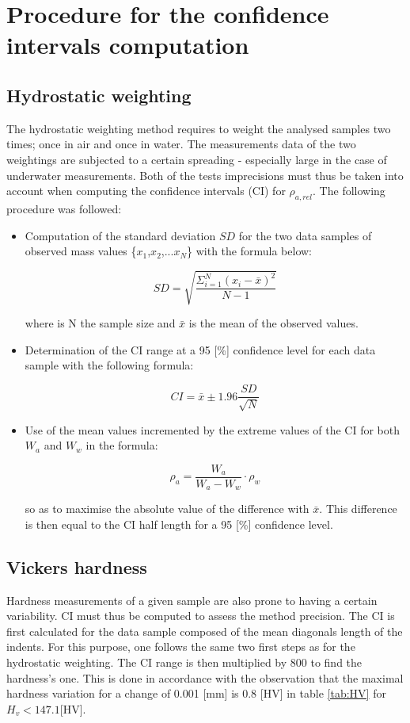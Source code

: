 
\chapter{Procedure for the confidence intervals computation} %

\label{AppendixC} %

\section{Hydrostatic weighting}

The hydrostatic weighting method requires to weight the analysed samples two times; once in air and once in water. The measurements data of the two weightings are subjected to a certain spreading - especially large in the case of underwater measurements. Both of the tests imprecisions must thus be taken into account when computing the confidence intervals (CI) for $\rho_{a,rel}$. The following procedure was followed:

\begin{itemize}
\item Computation of the standard deviation $SD$ for the two data samples of observed mass values \{$x_1$,$x_2$,...$x_N$\} with the formula below:

$$SD=\sqrt{\frac{\Sigma^N_{i=1}(x_i-\bar{x})^2}{N-1}} $$

where is N the sample size and $\bar{x}$ is the mean of the observed values.

\item Determination of the CI range at a 95 [\%] confidence level for each data sample with the following formula:

$$CI= \bar{x} \pm 1.96 \frac{SD}{\sqrt{N}}$$

\item Use of the mean values incremented by the extreme values of the CI for both $W_a$ and $W_w$ in the formula:


$$\rho_a=\frac{W_a}{W_a-W_w} \cdot \rho_w $$

so as to maximise the absolute value of the difference with $\bar{x}$. This difference is then equal to the CI half length for a 95 [\%] confidence level.
\end{itemize}

\section{Vickers hardness}

Hardness measurements of a given sample are also prone to having a certain variability. CI must thus be computed to assess the method precision. The CI is first calculated for the data sample composed of the mean diagonals length of the indents. For this purpose, one follows the same two first steps as for the hydrostatic weighting. The CI range is then multiplied by 800 to find the hardness's one. This is done in accordance with the observation that the maximal hardness variation for a change of 0.001 [mm] is 0.8 [HV] in table \ref{tab:HV} for $H_v<147.1 $[HV].%